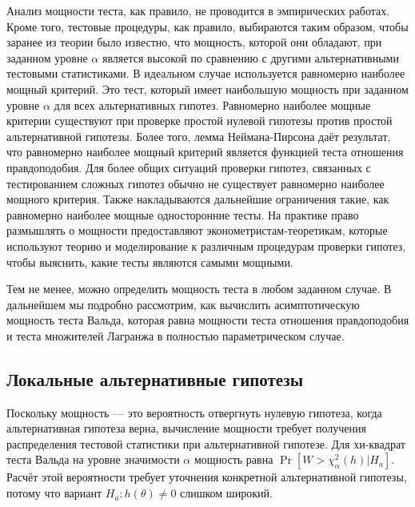 Анализ мощности теста, как правило, не проводится в эмпирических работах. Кроме того, тестовые процедуры, как правило, выбираются таким образом, чтобы заранее из теории было известно, что мощность, которой они обладают, при заданном уровне $\alpha$ является высокой по сравнению с другими альтернативными тестовыми статистиками. В идеальном случае используется равномерно наиболее мощный критерий. Это тест, который имеет наибольшую мощность при заданном уровне $\alpha$ для всех альтернативных гипотез. Равномерно наиболее мощные критерии существуют при проверке простой нулевой гипотезы против простой альтернативной гипотезы. Более того, лемма Неймана-Пирсона даёт результат, что равномерно наиболее мощный критерий является функцией теста отношения правдоподобия. Для более общих ситуаций проверки гипотез, связанных с тестированием сложных гипотез обычно не существует равномерно наиболее мощного критерия. Также накладываются дальнейшие ограничения такие, как равномерно наиболее мощные односторонние тесты. На практике право размышлять о мощности предоставляют эконометристам-теоретикам, которые используют теорию и моделирование к различным процедурам проверки гипотез, чтобы выяснить, какие тесты являются самыми мощными.

Тем не менее, можно определить мощность теста в любом заданном случае. В дальнейшем мы подробно рассмотрим, как вычислить асимптотическую мощность теста Вальда, которая равна мощности теста отношения правдоподобия и теста множителей Лагранжа в полностью параметрическом случае.

\subsection{Локальные альтернативные гипотезы}

Поскольку мощность --- это вероятность отвергнуть нулевую гипотеза, когда альтернативная гипотеза верна, вычисление мощности требует получения распределения тестовой статистики при альтернативной гипотезе. Для хи-квадрат теста Вальда на уровне значимости $\alpha$ мощность равна $\Pr[W > \chi_{\alpha}^2(h)|H_a]$. Расчёт этой вероятности требует уточнения конкретной альтернативной гипотезы, потому что вариант $H_a: h(\theta) \not= 0$ слишком широкий.

